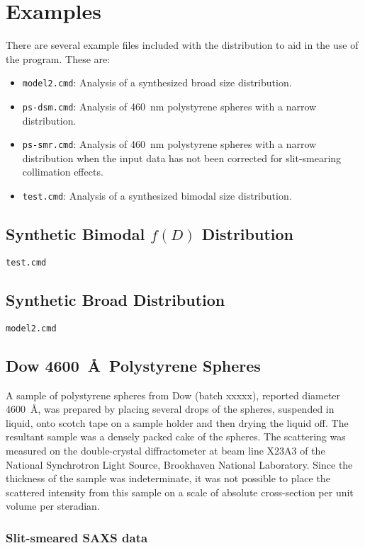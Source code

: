 \documentclass[letterpaper]{article}
\begin{document}
\section{Examples}

There are several example files included with the 
distribution to aid in the use of the program.  These 
are:
\begin{itemize}
  \item \verb|model2.cmd|: Analysis of a synthesized 
   broad size distribution.
  \item \verb|ps-dsm.cmd|: Analysis of 460~nm 
   polystyrene spheres with a narrow distribution.
  \item \verb|ps-smr.cmd|: Analysis of 460~nm 
   polystyrene spheres with a narrow distribution 
   when the input data has not been corrected for 
   slit-smearing collimation effects.
  \item \verb|test.cmd|: Analysis of a synthesized 
     bimodal size distribution.
\end{itemize}

\subsection{Synthetic Bimodal $f(D)$ Distribution}
{\texttt{test.cmd}}

\subsection{Synthetic Broad Distribution}
{\texttt{model2.cmd}}

\subsection{Dow 4600~\AA\ Polystyrene Spheres}

A sample of polystyrene spheres from Dow (batch 
xxxxx), reported diameter 4600~\AA, 
was prepared by placing several drops of the 
spheres, suspended in liquid, onto scotch tape on a 
sample holder and then drying the liquid off.  The 
resultant sample was a densely packed cake of the 
spheres.  The scattering was measured on the 
double-crystal diffractometer at beam line X23A3 of 
the National Synchrotron Light Source, Brookhaven 
National Laboratory.  Since the thickness of the 
sample was indeterminate, it was not possible to 
place the scattered intensity from this sample on a scale of 
absolute cross-section per unit volume per steradian.

\subsubsection{Slit-smeared SAXS data}
\end{document}

